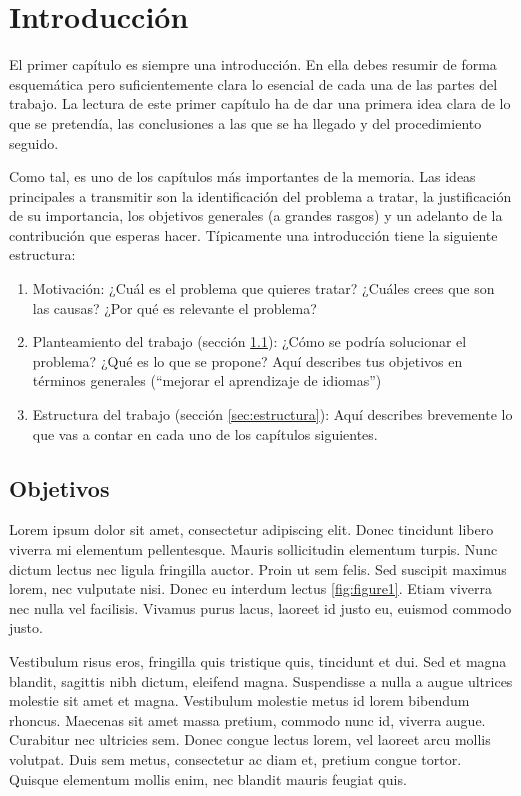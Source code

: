 \chapter{Introducción}\label{chap:introduccion}
El primer capítulo es siempre una introducción. En ella debes resumir de forma
esquemática pero suficientemente clara lo esencial de cada una de las partes del
trabajo. La lectura de este primer capítulo ha de dar una primera idea clara de lo que se pretendía, las conclusiones a las que se ha llegado y del procedimiento seguido.\par 
Como tal, es uno de los capítulos más importantes de la memoria. Las ideas principales a transmitir son la identificación del problema a tratar, la justificación de su importancia, los objetivos generales (a grandes rasgos) y un adelanto de la contribución que esperas hacer. Típicamente una introducción tiene la siguiente estructura:\par

\begin{enumerate}
    \item Motivación: ¿Cuál es el problema que quieres tratar? ¿Cuáles crees que son las causas? ¿Por qué es relevante el problema?
    \item Planteamiento del trabajo (sección \ref{sec:objetivos}): ¿Cómo se podría solucionar el problema? ¿Qué es lo que se propone? Aquí describes tus objetivos en términos generales (``mejorar el aprendizaje de idiomas'')
    \item Estructura del trabajo (sección \ref{sec:estructura}): Aquí describes brevemente lo que vas a contar en cada uno de los capítulos siguientes.
\end{enumerate}

\section{Objetivos}\label{sec:objetivos}
Lorem ipsum dolor sit amet, consectetur adipiscing elit. Donec tincidunt libero viverra mi elementum pellentesque. Mauris sollicitudin elementum turpis. Nunc dictum lectus nec ligula fringilla auctor. Proin ut sem felis. Sed suscipit maximus lorem, nec vulputate nisi. Donec eu interdum lectus \ref{fig:figure1}. Etiam viverra nec nulla vel facilisis. Vivamus purus lacus, laoreet id justo eu, euismod commodo justo.\par

Vestibulum risus eros, fringilla quis tristique quis, tincidunt et dui. Sed et magna blandit, sagittis nibh dictum, eleifend magna. Suspendisse a nulla a augue ultrices molestie sit amet et magna. Vestibulum molestie metus id lorem bibendum rhoncus. Maecenas sit amet massa pretium, commodo nunc id, viverra augue. Curabitur nec ultricies sem. Donec congue lectus lorem, vel laoreet arcu mollis volutpat. Duis sem metus, consectetur ac diam et, pretium congue tortor. Quisque elementum mollis enim, nec blandit mauris feugiat quis.\par

